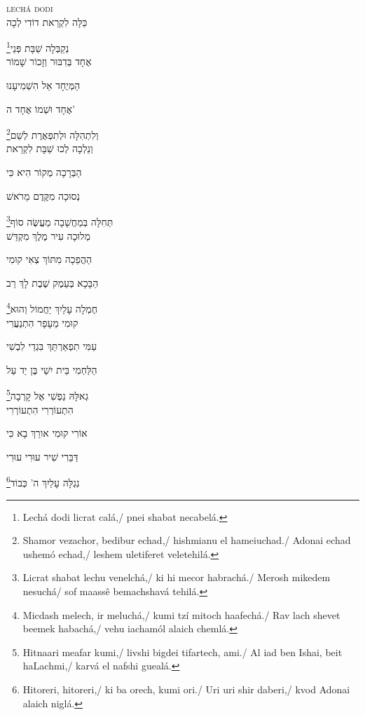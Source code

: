 \vspace*{1cm}

\textsc{lechá dodi}\\[15pt]

כַּלָּה לִקְרַאת דוֹדִי לְכָה

\footnote{Lechá dodi licrat calá,/ pnei shabat necabelá.}נְקַבְּלָה שַׁבָּת פְּנֵי\\[10pt]

אֶחָד בְּדִבּוּר וְזָכוֹר שָׁמוֹר

הַמְּיֻחָד אֵל הִשְׁמִיעָנוּ

אֶחָד וּשְׁמוֹ אֶחָד ה' 

\footnote{Shamor vezachor, bedibur echad,/ hishmianu el hameiuchad./ Adonai echad ushemó echad,/ leshem uletiferet veletehilá.}וְלִתְהִלָּה וּלְתִפְאֶרֶת לְשֵׁם\\[10pt]

וְנֵלְכָה לְכוּ שַׁבָּת לִקְרַאת

הַבְּרָכָה מְקוֹר הִיא כִּי

נְסוּכָה מִקֶּדֶם מֵרֹאשׁ 

\footnote{Licrat shabat lechu venelchá,/ ki hi mecor habrachá./ Merosh mikedem nesuchá/ sof maassê bemachshavá tehilá.}תְּחִלָּה בְּמַחֲשָׁבָה מַעֲשֶּׂה סוֹף\\[10pt]

מְלוּכָה עִיר מֶלֶךְ  מִקְדַּשׁ

הַהֲפֵכָה מִתּוֹךְ צְאִי קוּמִי 

הַבָּכָא בְּעֵמֶק שֶׁבֶת  לָךְ רַב

\footnote{Micdash melech, ir meluchá,/ kumi tzí mitoch haafechá./ Rav lach shevet beemek habachá,/ vehu iachamól alaich chemlá.}חֶמְלָה עָלַיִךְ יַחֲמוֹל  וְהוּא\\[10pt]

קוּמִי מֵעָפָר הִתְנַעֲרִי

עַמִּי תִפְאַרְתֵּךְ בִּגְדֵי לִבְשִׁי 

הַלַּחְמִי בֵּית יִשַׁי בֶּן יַד עַל

\footnote{Hitnaari meafar kumi,/ livshi bigdei tifartech, ami./ Al iad ben Ishai, beit haLachmi,/ karvá el nafshi guealá.}גְאלָּהּ נַפְשִׁי אֶל קָרְבָה\\[10pt]

הִתְעוֹרְרִי הִתְעוֹרְרִי

אוֹרִי קוּמִי אורֵךְ בָא כִּי

דַּבֵּרִי שִׁיר עוּרִי עוּרִי

\footnote{Hitoreri, hitoreri,/ ki ba orech, kumi ori./ Uri uri shir daberi,/ kvod Adonai alaich niglá.}נִגְלָּה עָלַיִךְ ה' כְּבוֹד\\[10pt]


